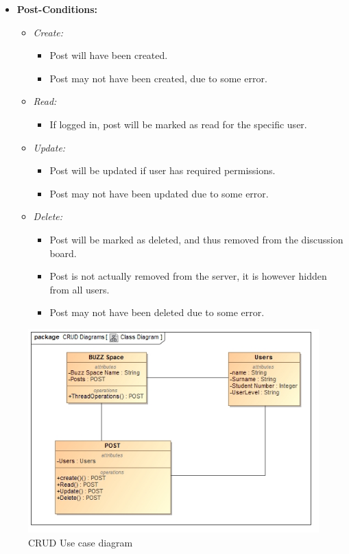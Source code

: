 \documentclass[11pt]{article}
\begin{document}
\begin{enumerate}
\begin{itemize}
\begin{itemize}
		\end{itemize}
		\item \textbf{Post-Conditions: }
		\begin{itemize}
		\item \textit{Create: }
			\begin{itemize}
			\item Post will have been created.
			\item Post may not have been created, due to some error.
			\end{itemize}
		\item \textit{Read: }
			\begin{itemize}
			\item If logged in, post will be marked as read for the 				specific user.
			\end{itemize}
		\item \textit{Update: }
			\begin{itemize}
			\item Post will be updated if user has required 						permissions.
			\item Post may not have been updated due to some error.
			\end{itemize}
		\item \textit{Delete: }
			\begin{itemize}
			\item Post will be marked as deleted, and thus removed 					from the discussion board.
			\item Post is not actually removed from the server, it is 					however hidden from all users.
		\item Post may not have been deleted due to some error. 
			\end{itemize}			
			
		\end{itemize}
	
	\end{itemize}
	
\graphicspath{ {../Diagrams/Kyhle/Class_Diagrams/} }	
	\begin{figure}[H]	
    	\includegraphics[scale=0.5]{CRUD.jpg}
    	\caption{CRUD Use case diagram}
	\end{figure}
		

\end{enumerate}
\end{document}
